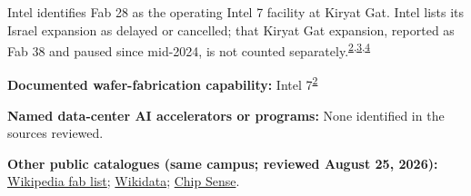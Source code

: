 \begin{minipage}[t][0.90\textheight][t]{\textwidth}
\begin{minipage}[t]{\textwidth}
\begin{minipage}[t]{0.32\textwidth}
\medskip
{\footnotesize Intel identifies Fab 28 as the operating Intel 7 facility at Kiryat Gat. Intel lists its Israel expansion as delayed or cancelled; that Kiryat Gat expansion, reported as Fab 38 and paused since mid-2024, is not counted separately.\nobreak\textsuperscript{\href{\detokenize{https://www.intc.com/filings-reports/all-sec-filings/content/0000050863-26-000011/intc-20251227.htm}}{\textcolor{accent}{2}},\href{\detokenize{https://web.archive.org/web/20260508212537/https://www.intel.com/content/www/us/en/corporate-responsibility/intel-in-israel.html}}{\textcolor{accent}{3}},\href{\detokenize{https://www.tomshardware.com/tech-industry/semiconductors/intels-fab-roadmap-examined}}{\textcolor{accent}{4}}}\par}
\medskip
{\footnotesize\textbf{Documented wafer-fabrication capability:} Intel 7\nobreak\textsuperscript{\href{\detokenize{https://www.intc.com/filings-reports/all-sec-filings/content/0000050863-26-000011/intc-20251227.htm}}{\textcolor{accent}{2}}}\par}
\end{minipage}
\end{minipage}
\par\vspace{0.65em}
\medskip
{\footnotesize\textbf{Named data-center AI accelerators or programs:} None identified in the sources reviewed.\par}
\smallskip
{\sffamily\scriptsize\color{black!62}\textbf{Other public catalogues (same campus; reviewed August 25, 2026):} \href{\detokenize{https://en.wikipedia.org/w/index.php?title=List_of_semiconductor_fabrication_plants&oldid=1370451124}\#\detokenize{Open_plants}}{Wikipedia fab list}; \href{\detokenize{https://www.wikidata.org/w/index.php?title=Q113325038&oldid=1694261910}}{Wikidata}; \href{\detokenize{https://github.com/aminalav/chip-sense/blob/93d22afe9e1309a7bebd6c7c96541f069f1d67ac/src/data/fab-sites.json}\#\detokenize{L163-L170}}{Chip Sense}.\par}
\medskip

\end{minipage}

